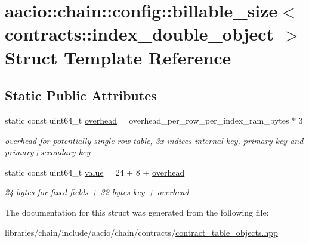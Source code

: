 \hypertarget{structaacio_1_1chain_1_1config_1_1billable__size_3_01contracts_1_1index__double__object_01_4}{}\section{aacio\+:\+:chain\+:\+:config\+:\+:billable\+\_\+size$<$ contracts\+:\+:index\+\_\+double\+\_\+object $>$ Struct Template Reference}
\label{structaacio_1_1chain_1_1config_1_1billable__size_3_01contracts_1_1index__double__object_01_4}
\subsection*{Static Public Attributes}
\begin{DoxyCompactItemize}
\item 
\mbox{\label{structaacio_1_1chain_1_1config_1_1billable__size_3_01contracts_1_1index__double__object_01_4_a14ee967842fd58e51b794c0aa0539658}} 
static const uint64\+\_\+t \mbox{\hyperlink{structaacio_1_1chain_1_1config_1_1billable__size_3_01contracts_1_1index__double__object_01_4_a14ee967842fd58e51b794c0aa0539658}{overhead}} = overhead\+\_\+per\+\_\+row\+\_\+per\+\_\+index\+\_\+ram\+\_\+bytes $\ast$ 3
\begin{DoxyCompactList}\small\item\em overhead for potentially single-\/row table, 3x indices internal-\/key, primary key and primary+secondary key \end{DoxyCompactList}\item 
\mbox{\label{structaacio_1_1chain_1_1config_1_1billable__size_3_01contracts_1_1index__double__object_01_4_ad631291f39c7c93ce3a5f2550c6d6bbd}} 
static const uint64\+\_\+t \mbox{\hyperlink{structaacio_1_1chain_1_1config_1_1billable__size_3_01contracts_1_1index__double__object_01_4_ad631291f39c7c93ce3a5f2550c6d6bbd}{value}} = 24 + 8 + \mbox{\hyperlink{structaacio_1_1chain_1_1config_1_1billable__size_3_01contracts_1_1index__double__object_01_4_a14ee967842fd58e51b794c0aa0539658}{overhead}}
\begin{DoxyCompactList}\small\item\em 24 bytes for fixed fields + 32 bytes key + overhead \end{DoxyCompactList}\end{DoxyCompactItemize}


The documentation for this struct was generated from the following file\+:\begin{DoxyCompactItemize}
\item 
libraries/chain/include/aacio/chain/contracts/\mbox{\hyperlink{contract__table__objects_8hpp}{contract\+\_\+table\+\_\+objects.\+hpp}}\end{DoxyCompactItemize}
